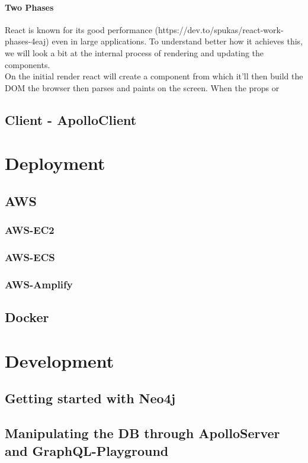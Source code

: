 \subsubsection{Two Phases}
React is known for its good performance (https://dev.to/spukas/react-work-phases-4eaj) even in large applications. To understand better how it achieves this, we will look a bit at the internal process of rendering and updating the components. \\
On the initial render react will create a component from which it'll then build the DOM the browser then parses and paints on the screen. When the props or 

\section{Client - ApolloClient}

\chapter{Deployment}
\section{AWS}
\subsection{AWS-EC2}
\subsection{AWS-ECS}
\subsection{AWS-Amplify}
\section{Docker}

\chapter{Development}
\section{Getting started with Neo4j}
\section{Manipulating the DB through ApolloServer and GraphQL-Playground}
